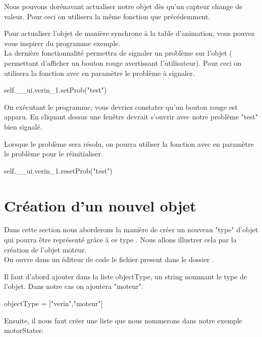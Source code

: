 Nous pouvons dorénavant actualiser notre objet dès qu'un capteur change de valeur. Pour ceci on utilisera la même fonction que précédemment.


Pour actualiser l'objet de manière synchrone à la table d'animation, vous pouvez vous inspirer du programme exemple.\\

La dernière fonctionnalité permettra de signaler un problème sur l'objet ( permettant d'afficher un bouton rouge avertissant l'utilisateur). Pour ceci on utilisera la fonction  avec en paramètre le problème à signaler.

\begin{pyCode}
    self.__ui.verin_1.setProb("test")
\end{pyCode}

On exécutant le programme, vous devriez constater qu'un bouton rouge est apparu. En cliquant dessus une fenêtre devrait s'ouvrir avec notre problème "test" bien signalé.


Lorsque le problème sera résolu, on pourra utiliser la fonction  avec en paramètre le problème pour le réinitialiser.
\begin{pyCode}
    self.__ui.verin_1.resetProb("test")
\end{pyCode}


\section{Création d'un nouvel objet}

Dans cette section nous aborderons la manière de créer un nouveau "type" d'objet qui pourra être représenté grâce à ce type . Nous allons illustrer cela par la création de l'objet moteur.\\


On ouvre dans un éditeur de code le fichier  present dans le dossier .


Il faut d'abord ajouter dans la liste objectType, un string nommant le type de l'objet. Dans notre cas on ajoutera "moteur". 
\begin{pyCode}
        objectType = ["verin","moteur"]
\end{pyCode}


Ensuite, il nous faut créer une liste que nous nommerons dans notre exemple motorStates:\\

